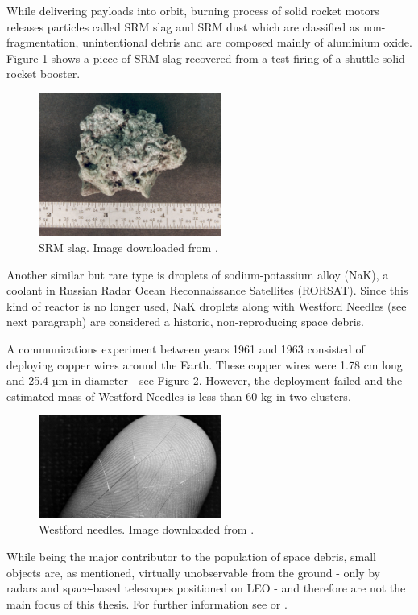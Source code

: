 	While delivering payloads into orbit, burning process of solid rocket motors releases particles called SRM slag and SRM dust which are classified as non-fragmentation, unintentional debris and are composed mainly of aluminium oxide. Figure \ref{fig:srmslag} shows a piece of SRM slag recovered from a test firing of a shuttle solid rocket booster.
	
\begin{figure}[H]
\centering
  \includegraphics[width=6cm]{images/slag}
  \caption{SRM slag. Image downloaded from \citep{NASA}.}
  \label{fig:srmslag}
\end{figure}
	
	Another similar but rare type is droplets of sodium-potassium alloy (NaK), a coolant in Russian Radar Ocean Reconnaissance Satellites (RORSAT). Since this kind of reactor is no longer used, NaK droplets along with Westford Needles (see next paragraph) are considered a historic, non-reproducing space debris. 
	
	A communications experiment between years 1961 and 1963 consisted of deploying copper wires around the Earth. These copper wires were 1.78 cm long and 25.4 µm in diameter - see Figure \ref{fig:westfordneedles}. However, the deployment failed and the estimated mass of Westford Needles is less than 60 kg in two clusters.
	
\begin{figure}[H]
\centering
  \includegraphics[width=6cm]{images/westfordneedles}
  \caption{Westford needles. Image downloaded from \citep{mit}.}
  \label{fig:westfordneedles}
\end{figure}	
	
	While being the major contributor to the population of space debris, small objects are, as mentioned, virtually unobservable from the ground - only by radars and space-based telescopes positioned on LEO - and therefore are not the main focus of this thesis. For further information see \citep{klinkrad2006space} or \citep{Silha2012id}.

